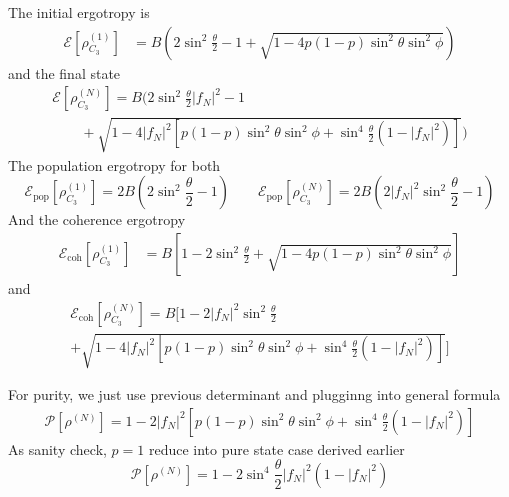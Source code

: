 \documentclass[../../../main.tex]{subfiles}
\begin{document}
The initial ergotropy is
\begin{align*}
  \mathcal{E} \left[ \rho^{(1)}_{C_3} \right]
   & = B \left( 2\sin^2 \frac{\theta }{2} - 1 + \sqrt{1 - 4p(1-p)\sin ^2\theta \sin^2 \phi}  \right)
\end{align*}
and the final state
\begin{multline*}
  \mathcal{E} \left[ \rho^{(N)}_{C_3} \right]     = B \bigg( 2\sin^2 \frac{\theta }{2} |f_N|^2 - 1
  \\  \qquad+  \sqrt{1 - 4|f_N|^2 \left[ p(1-p)\sin ^2\theta \sin^2 \phi + \sin ^4 \frac{\theta }{2 }(1-|f_N|^2) \right]}  \bigg)
\end{multline*}
The population ergotropy for both
\begin{equation*}
  \mathcal{E}_\text{pop} \left[ \rho^{(1)}_{C_3} \right]= 2B(2 \sin^2 \frac{\theta }{2 }-1)  \qquad
  \mathcal{E}_\text{pop} \left[ \rho^{(N)}_{C_3} \right]= 2B(2 |f_N|^2\sin ^2\frac{\theta}{2 }-1)
\end{equation*}
And the coherence ergotropy
\begin{align*}
  \mathcal{E}_\text{coh}\left[ \rho^{(1)}_{C_3}\right]
   & = B \left[  1 - 2 \sin ^2 \frac{\theta }{2} + \sqrt{1-4p(1-p)\sin ^2\theta \sin^2 \phi}  \right]
\end{align*}
and
\begin{multline*}
  \mathcal{E}_\text{coh}\left[ \rho^{(N)}_{C_3}\right]
  = B \bigg[  1 - 2 |f_N|^2\sin ^2 \frac{\theta }{2} \\
    + \sqrt{1-4 |f_N|^2 \left[ p(1-p)\sin ^2\theta \sin^2 \phi
        + \sin ^4 \frac{\theta }{2 }(1-|f_N|^2) \right] }  \bigg]
\end{multline*}

For purity, we just use previous determinant and plugginng into general formula
\begin{align*}
  \mathcal{P}[\rho^{(N)}]
  =
  1
  -2|f_N|^2
  \left[
    p(1-p)\sin^2\theta\sin^2\phi
    +
    \sin^4\frac{\theta}{2}
    \left(1-|f_N|^2\right)
    \right]
\end{align*}
As sanity check, $p=1$ reduce into pure state case derived earlier
\begin{equation*}
  \mathcal{P}[\rho^{(N)}] =
  1
  -2\sin^4\frac{\theta}{2}
  |f_N|^2(1-|f_N|^2)
\end{equation*}
\end{document}

